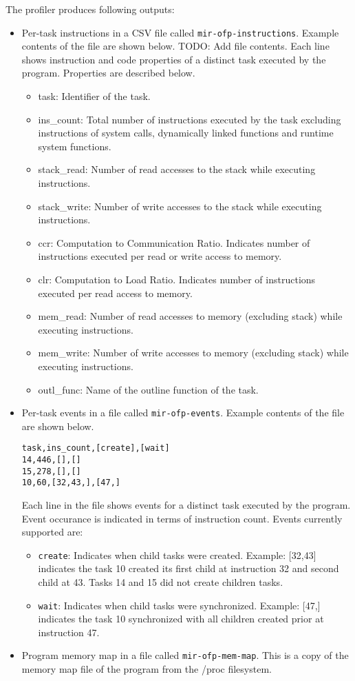 \documentclass[11pt,a4paper]{article}
\begin{document}
The profiler produces following outputs:
\begin{itemize}
    \item Per-task instructions in a CSV file called \texttt{mir-ofp-instructions}. Example contents of the file are shown below.  TODO: Add file contents.  Each line shows instruction and code properties of a distinct task executed by the program. Properties are described below.
        \begin{itemize}
            \item task: Identifier of the task.
            \item ins\_count: Total number of instructions executed by the task excluding instructions of system calls, dynamically linked functions and runtime system functions.
            \item stack\_read: Number of read accesses to the stack while executing instructions.
            \item stack\_write: Number of write accesses to the stack while executing instructions.
            \item ccr: Computation to Communication Ratio. Indicates number of instructions executed per read or write access to memory.
            \item clr: Computation to Load Ratio. Indicates number of instructions executed per read access to memory.
            \item mem\_read: Number of read accesses to memory (excluding stack) while executing instructions.
            \item mem\_write: Number of write accesses to memory (excluding stack) while executing instructions.
            \item outl\_func: Name of the outline function of the task.
        \end{itemize}
    \item Per-task events in a file called \texttt{mir-ofp-events}. Example contents of the file are shown below.
\begin{lstlisting}[style=MyInputStyle]
task,ins_count,[create],[wait]
14,446,[],[]
15,278,[],[]
10,60,[32,43,],[47,]
\end{lstlisting}
        Each line in the file shows events for a distinct task executed by the program. Event occurance is indicated in terms of instruction count. Events currently supported are:
        \begin{itemize}
            \item \texttt{create}: Indicates when child tasks were created. Example: [32,43] indicates the task 10 created its first child at instruction 32 and second child at 43. Tasks 14 and 15 did not create children tasks.
            \item \texttt{wait}: Indicates when child tasks were synchronized. Example: [47,] indicates the task 10 synchronized with all children created prior at instruction 47.
        \end{itemize}
    \item Program memory map in a file called \texttt{mir-ofp-mem-map}. This is a copy of the memory map file of the program from the /proc filesystem.
\end{itemize}
\end{document}
